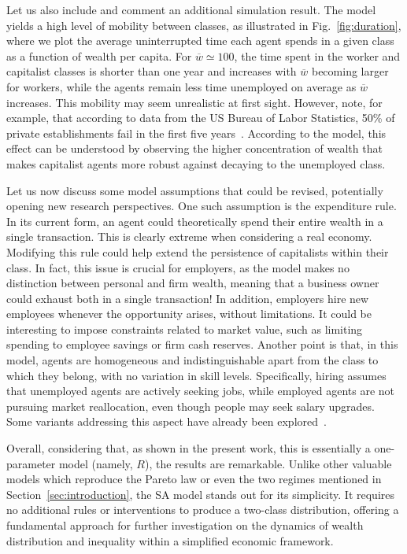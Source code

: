 Let us also include and comment an additional simulation result. The model yields a high level of mobility between classes, as illustrated in Fig.~\ref{fig:duration}, where we plot the average uninterrupted time each agent spends in a given class as a function of wealth per capita. For $\overline{w}\simeq100$, the time spent in the worker and capitalist classes is shorter than one year and increases with $\overline{w}$ becoming larger for workers, while the agents remain less time unemployed on average as $\overline{w}$ increases. This mobility may seem unrealistic at first sight. However, note, for example, that according to data from the US Bureau of Labor Statistics, 50\% of private establishments fail in the first five years~\cite{BLS-US}. According to the model, this effect can be understood by observing the higher concentration of wealth that makes capitalist agents more robust against decaying to the unemployed class.

Let us now discuss some model assumptions that could be revised, potentially opening new research perspectives. One such assumption is the expenditure rule. In its current form, an agent could theoretically spend their entire wealth in a single transaction. This is clearly extreme when considering a real economy. Modifying this rule could help extend the persistence of capitalists within their class. In fact, this issue is crucial for employers, as the model makes no distinction between personal and firm wealth, meaning that a business owner could exhaust both in a single transaction! In addition, employers hire new employees whenever the opportunity arises, without limitations. It could be interesting to impose constraints related to market value, such as limiting spending to employee savings or firm cash reserves. Another point is that, in this model, agents are homogeneous and indistinguishable apart from the class to which they belong, with no variation in skill levels. Specifically, hiring assumes that unemployed agents are actively seeking jobs, while employed agents are not pursuing market reallocation, even though people may seek salary upgrades. Some variants addressing this aspect have already been explored~\cite{wright2008implicit}.

Overall, considering that, as shown in the present work, this is essentially a one-parameter model (namely, $R$), the results are remarkable. Unlike other valuable models which reproduce the Pareto law or even the two regimes mentioned in Section~\ref{sec:introduction}, the SA model stands out for its simplicity. It requires no additional rules or interventions to produce a two-class distribution, offering a fundamental approach for further investigation on the dynamics of wealth distribution and inequality within a simplified economic framework.%

